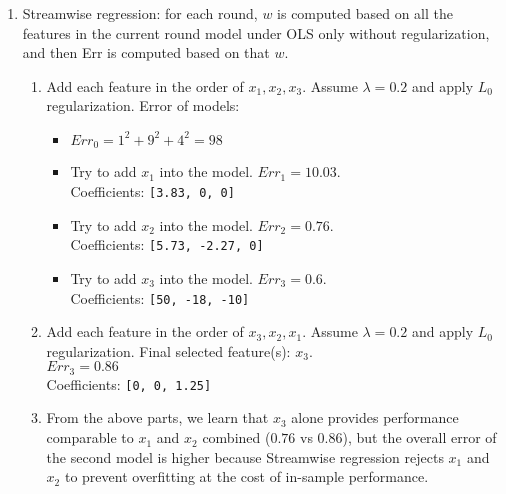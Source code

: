 \begin{enumerate}
    \item Streamwise regression: for each round, $w$ is computed based on all the features in the current round model under OLS only without regularization, and then Err is computed based on that $w$.
    \begin{enumerate}
        \item Add each feature in the order of $x_1, x_2, x_3$. Assume $\lambda = 0.2$ and apply $L_0$ regularization. Error of models:
        \begin{itemize}
        	\item $Err_0 = 1^2 + 9^2 + 4^2 = 98$
        	\item Try to add $x_1$ into the model. $Err_1 = 10.03$. \\
        			Coefficients: \verb|[3.83, 0, 0]|
        	\item Try to add $x_2$ into the model. $Err_2 = 0.76$. \\
        			Coefficients: \verb|[5.73, -2.27, 0]|
        	\item Try to add $x_3$ into the model. $Err_3 = 0.6$. \\
        			Coefficients: \verb|[50, -18, -10]|
        \end{itemize}
        \item Add each feature in the order of $x_3, x_2, x_1$. Assume $\lambda = 0.2$ and apply $L_0$ regularization. Final selected feature(s): $x_3$. \\
        $Err_3 = 0.86$ \\
        Coefficients: \verb|[0, 0, 1.25]|
        \item From the above parts, we learn that $x_3$ alone provides performance comparable to $x_1$ and $x_2$ combined ($0.76$ vs $0.86$), but the overall error of the second model is higher because Streamwise regression rejects $x_1$ and $x_2$ to prevent overfitting at the cost of in-sample performance.
    \end{enumerate}
    

\end{enumerate}
